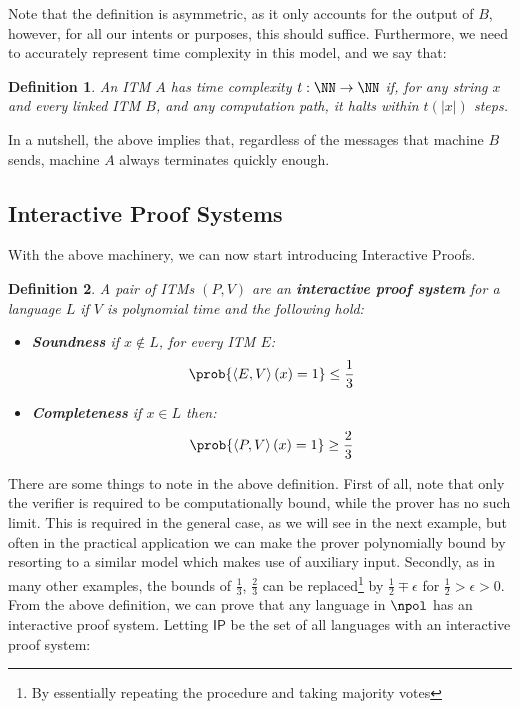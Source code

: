 \documentclass{article}
\newtheorem{definition}{Definition}
\begin{document}
Note that the definition is asymmetric, as it only accounts for the output of $B$, however, for all our intents or purposes, this should suffice.
Furthermore, we need to accurately represent time complexity in this model, and we say that:

\begin{definition}
    An ITM $A$ has time complexity $t: \NN \to \NN$ if, for any string $x$ and every linked ITM $B$, and any computation path, it halts within $t(|x|)$ steps.
\end{definition}

In a nutshell, the above implies that, regardless of the messages that machine $B$ sends, machine $A$ always terminates quickly enough.

\subsection{Interactive Proof Systems}
With the above machinery, we can now start introducing Interactive Proofs\cite{goldwasserKnowledgeComplexityInteractive1989}.
\begin{definition}
    A pair of ITMs $(P, V)$ are an \textbf{interactive proof system} for a language $L$ if $V$ is polynomial time and the following hold:
    \begin{itemize}
        \item \textbf{Soundness} if $x \notin L$, for every ITM $E$:
              \[ \prob{\left<E,V \right>(x) = 1} \leq \frac{1}{3} \]
        \item \textbf{Completeness} if $x \in L$ then:
              \[ \prob{\left<P, V\right>(x) = 1 } \geq \frac{2}{3}\]
    \end{itemize}
\end{definition}
There are some things to note in the above definition. First of all, note that only the verifier is required to be computationally bound, while the prover has no such limit. This is required in the general case, as we will see in the next example, but often in the practical application we can make the prover polynomially bound by resorting to a similar model which makes use of auxiliary input. Secondly, as in many other examples, the bounds of $\frac{1}{3}$, $\frac{2}{3}$ can be replaced\footnote{By essentially repeating the procedure and taking majority votes} by $\frac{1}{2} \mp \epsilon$ for $\frac{1}{2} > \epsilon > 0$. From the above definition, we can prove that any language in $\npol$ has an interactive proof system. Letting $\mathsf{IP}$ be the set of all languages with an interactive proof system:
\end{document}
